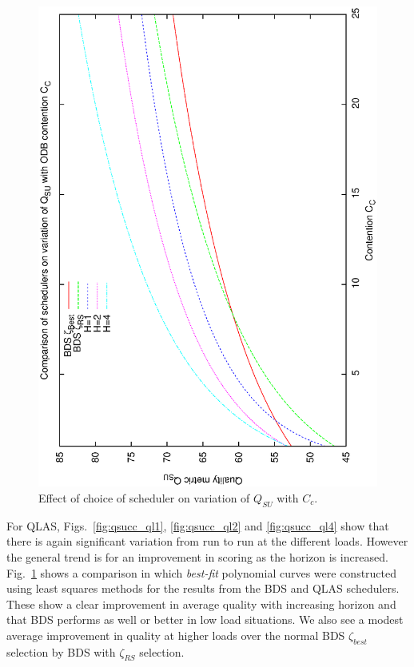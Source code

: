 \begin{figure}[h]

\begin{center}
 \includegraphics[scale=0.5, angle=-90]{figures/qsucc_allfit2.eps}
 \caption[Effect of choice of scheduler on variation of $Q_{SU}$ with $C_c$.] 
   {Effect of choice of scheduler on variation of $Q_{SU}$ with $C_c$.}
 \label{fig:qsucc_allfit}
\end{center}
\end{figure}

For QLAS, Figs.~\ref{fig:qsucc_ql1}, \ref{fig:qsucc_ql2} and \ref{fig:qsucc_ql4} show that there is again significant variation from run to run at the different loads. However the general trend is for an improvement in scoring as the horizon is increased. Fig.~\ref{fig:qsucc_allfit} shows a comparison in which \emph{best-fit} polynomial curves were constructed using least squares methods for the results from the BDS and QLAS schedulers. These show a clear improvement in average quality with increasing horizon and that BDS performs as well or better in low load situations. We also see a modest average improvement in quality at higher loads over the normal BDS $\zeta_{best}$ selection by BDS with $\zeta_{RS}$ selection.


